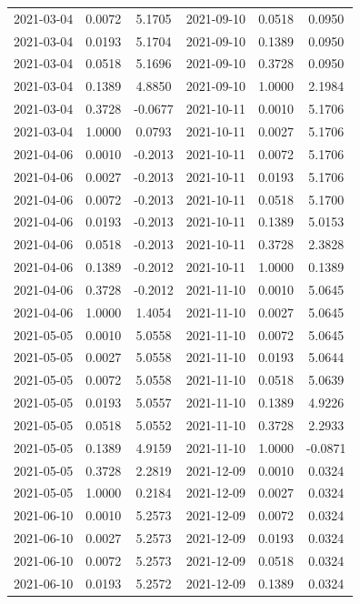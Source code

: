 \begin{footnotesize}
\begin{longtable}{lcc|lcc}
2021-03-04 & 0.0072 & 5.1705 & 2021-09-10 & 0.0518 & 0.0950 \\
2021-03-04 & 0.0193 & 5.1704 & 2021-09-10 & 0.1389 & 0.0950 \\
2021-03-04 & 0.0518 & 5.1696 & 2021-09-10 & 0.3728 & 0.0950 \\
2021-03-04 & 0.1389 & 4.8850 & 2021-09-10 & 1.0000 & 2.1984 \\
2021-03-04 & 0.3728 & -0.0677 & 2021-10-11 & 0.0010 & 5.1706 \\
2021-03-04 & 1.0000 & 0.0793 & 2021-10-11 & 0.0027 & 5.1706 \\
2021-04-06 & 0.0010 & -0.2013 & 2021-10-11 & 0.0072 & 5.1706 \\
2021-04-06 & 0.0027 & -0.2013 & 2021-10-11 & 0.0193 & 5.1706 \\
2021-04-06 & 0.0072 & -0.2013 & 2021-10-11 & 0.0518 & 5.1700 \\
2021-04-06 & 0.0193 & -0.2013 & 2021-10-11 & 0.1389 & 5.0153 \\
2021-04-06 & 0.0518 & -0.2013 & 2021-10-11 & 0.3728 & 2.3828 \\
2021-04-06 & 0.1389 & -0.2012 & 2021-10-11 & 1.0000 & 0.1389 \\
2021-04-06 & 0.3728 & -0.2012 & 2021-11-10 & 0.0010 & 5.0645 \\
2021-04-06 & 1.0000 & 1.4054 & 2021-11-10 & 0.0027 & 5.0645 \\
2021-05-05 & 0.0010 & 5.0558 & 2021-11-10 & 0.0072 & 5.0645 \\
2021-05-05 & 0.0027 & 5.0558 & 2021-11-10 & 0.0193 & 5.0644 \\
2021-05-05 & 0.0072 & 5.0558 & 2021-11-10 & 0.0518 & 5.0639 \\
2021-05-05 & 0.0193 & 5.0557 & 2021-11-10 & 0.1389 & 4.9226 \\
2021-05-05 & 0.0518 & 5.0552 & 2021-11-10 & 0.3728 & 2.2933 \\
2021-05-05 & 0.1389 & 4.9159 & 2021-11-10 & 1.0000 & -0.0871 \\
2021-05-05 & 0.3728 & 2.2819 & 2021-12-09 & 0.0010 & 0.0324 \\
2021-05-05 & 1.0000 & 0.2184 & 2021-12-09 & 0.0027 & 0.0324 \\
2021-06-10 & 0.0010 & 5.2573 & 2021-12-09 & 0.0072 & 0.0324 \\
2021-06-10 & 0.0027 & 5.2573 & 2021-12-09 & 0.0193 & 0.0324 \\
2021-06-10 & 0.0072 & 5.2573 & 2021-12-09 & 0.0518 & 0.0324 \\
2021-06-10 & 0.0193 & 5.2572 & 2021-12-09 & 0.1389 & 0.0324 \\

\end{longtable}
\end{footnotesize}

